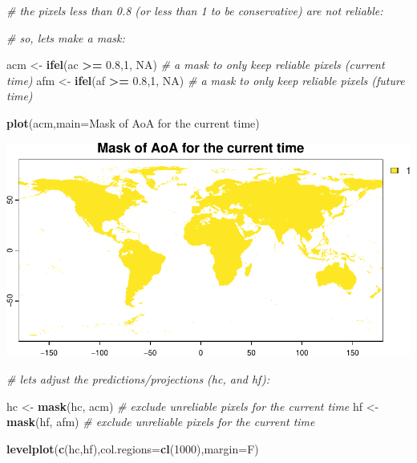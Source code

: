\documentclass[
]{article}
\newenvironment{Shaded}{\begin{snugshade}}{\end{snugshade}}
\newcommand{\AttributeTok}[1]{\textcolor[rgb]{0.13,0.29,0.53}{#1}}
\newcommand{\CommentTok}[1]{\textcolor[rgb]{0.56,0.35,0.01}{\textit{#1}}}
\newcommand{\ConstantTok}[1]{\textcolor[rgb]{0.56,0.35,0.01}{#1}}
\newcommand{\DecValTok}[1]{\textcolor[rgb]{0.00,0.00,0.81}{#1}}
\newcommand{\FloatTok}[1]{\textcolor[rgb]{0.00,0.00,0.81}{#1}}
\newcommand{\FunctionTok}[1]{\textcolor[rgb]{0.13,0.29,0.53}{\textbf{#1}}}
\newcommand{\NormalTok}[1]{#1}
\newcommand{\OtherTok}[1]{\textcolor[rgb]{0.56,0.35,0.01}{#1}}
\newcommand{\SpecialCharTok}[1]{\textcolor[rgb]{0.81,0.36,0.00}{\textbf{#1}}}
\newcommand{\StringTok}[1]{\textcolor[rgb]{0.31,0.60,0.02}{#1}}
\begin{document}
\begin{Shaded}
\begin{Highlighting}[]
\CommentTok{\# the pixels less than 0.8 (or less than 1 to be conservative) are not reliable:}

\CommentTok{\# so, let\textquotesingle{}s make a mask:}

\NormalTok{acm }\OtherTok{\textless{}{-}} \FunctionTok{ifel}\NormalTok{(ac }\SpecialCharTok{\textgreater{}=} \FloatTok{0.8}\NormalTok{,}\DecValTok{1}\NormalTok{, }\ConstantTok{NA}\NormalTok{) }\CommentTok{\# a mask to only keep reliable pixels (current time)}
\NormalTok{afm }\OtherTok{\textless{}{-}} \FunctionTok{ifel}\NormalTok{(af }\SpecialCharTok{\textgreater{}=} \FloatTok{0.8}\NormalTok{,}\DecValTok{1}\NormalTok{, }\ConstantTok{NA}\NormalTok{) }\CommentTok{\# a mask to only keep reliable pixels (future time)}

\FunctionTok{plot}\NormalTok{(acm,}\AttributeTok{main=}\StringTok{\textquotesingle{}Mask of AoA for the current time\textquotesingle{}}\NormalTok{)}
\end{Highlighting}
\end{Shaded}

\includegraphics{sdm_R_files/figure-latex/unnamed-chunk-11-4.pdf}

\begin{Shaded}
\begin{Highlighting}[]
\CommentTok{\# let\textquotesingle{}s adjust the predictions/projections (hc, and hf):}

\NormalTok{hc }\OtherTok{\textless{}{-}} \FunctionTok{mask}\NormalTok{(hc, acm) }\CommentTok{\# exclude unreliable pixels for the current time}
\NormalTok{hf }\OtherTok{\textless{}{-}} \FunctionTok{mask}\NormalTok{(hf, afm) }\CommentTok{\# exclude unreliable pixels for the current time}

\FunctionTok{levelplot}\NormalTok{(}\FunctionTok{c}\NormalTok{(hc,hf),}\AttributeTok{col.regions=}\FunctionTok{cl}\NormalTok{(}\DecValTok{1000}\NormalTok{),}\AttributeTok{margin=}\NormalTok{F)}
\end{Highlighting}
\end{Shaded}
\end{document}
